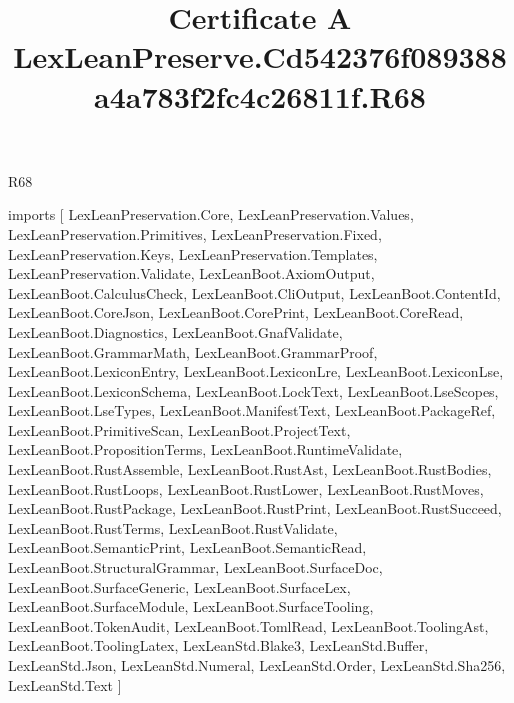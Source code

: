 \begin{lexlean}{R68}
\title{Certificate A LexLeanPreserve.Cd542376f089388a4a783f2fc4c26811f.R68}
\begin{coremodule}
imports [
  LexLeanPreservation.Core,
  LexLeanPreservation.Values,
  LexLeanPreservation.Primitives,
  LexLeanPreservation.Fixed,
  LexLeanPreservation.Keys,
  LexLeanPreservation.Templates,
  LexLeanPreservation.Validate,
  LexLeanBoot.AxiomOutput,
  LexLeanBoot.CalculusCheck,
  LexLeanBoot.CliOutput,
  LexLeanBoot.ContentId,
  LexLeanBoot.CoreJson,
  LexLeanBoot.CorePrint,
  LexLeanBoot.CoreRead,
  LexLeanBoot.Diagnostics,
  LexLeanBoot.GnafValidate,
  LexLeanBoot.GrammarMath,
  LexLeanBoot.GrammarProof,
  LexLeanBoot.LexiconEntry,
  LexLeanBoot.LexiconLre,
  LexLeanBoot.LexiconLse,
  LexLeanBoot.LexiconSchema,
  LexLeanBoot.LockText,
  LexLeanBoot.LseScopes,
  LexLeanBoot.LseTypes,
  LexLeanBoot.ManifestText,
  LexLeanBoot.PackageRef,
  LexLeanBoot.PrimitiveScan,
  LexLeanBoot.ProjectText,
  LexLeanBoot.PropositionTerms,
  LexLeanBoot.RuntimeValidate,
  LexLeanBoot.RustAssemble,
  LexLeanBoot.RustAst,
  LexLeanBoot.RustBodies,
  LexLeanBoot.RustLoops,
  LexLeanBoot.RustLower,
  LexLeanBoot.RustMoves,
  LexLeanBoot.RustPackage,
  LexLeanBoot.RustPrint,
  LexLeanBoot.RustSucceed,
  LexLeanBoot.RustTerms,
  LexLeanBoot.RustValidate,
  LexLeanBoot.SemanticPrint,
  LexLeanBoot.SemanticRead,
  LexLeanBoot.StructuralGrammar,
  LexLeanBoot.SurfaceDoc,
  LexLeanBoot.SurfaceGeneric,
  LexLeanBoot.SurfaceLex,
  LexLeanBoot.SurfaceModule,
  LexLeanBoot.SurfaceTooling,
  LexLeanBoot.TokenAudit,
  LexLeanBoot.TomlRead,
  LexLeanBoot.ToolingAst,
  LexLeanBoot.ToolingLatex,
  LexLeanStd.Blake3,
  LexLeanStd.Buffer,
  LexLeanStd.Json,
  LexLeanStd.Numeral,
  LexLeanStd.Order,
  LexLeanStd.Sha256,
  LexLeanStd.Text
]


\end{coremodule}
\end{lexlean}
